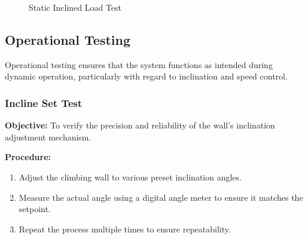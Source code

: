 \begin{figure}[htbp]
    \centering
    \caption{Static Inclined Load Test}
    \label{fig:static_inclined_load_test}
\end{figure}

\subsection{Operational Testing}
Operational testing ensures that the system functions as intended during dynamic operation, particularly with regard to inclination and speed control.

\subsubsection{Incline Set Test}
\textbf{Objective:} To verify the precision and reliability of the wall's inclination adjustment mechanism.

\textbf{Procedure:}
\begin{enumerate}
    \item Adjust the climbing wall to various preset inclination angles.
    \item Measure the actual angle using a digital angle meter to ensure it matches the setpoint.
    \item Repeat the process multiple times to ensure repeatability.
\end{enumerate}

